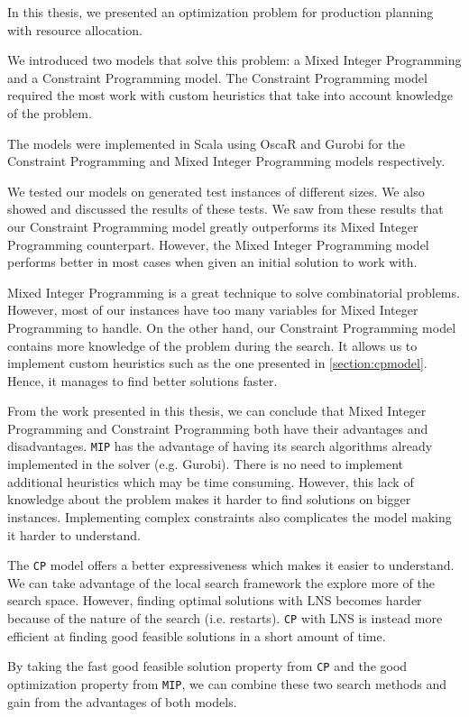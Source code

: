 \documentclass[../thesis.tex]{subfiles}
\begin{document}
In this thesis, we presented an optimization problem for production planning 
with resource allocation.

We introduced two models that solve
this problem: a Mixed Integer Programming and a Constraint Programming model.
The Constraint Programming model required the most work with custom heuristics that take into account knowledge of the problem.

The models were implemented in Scala using OscaR and Gurobi for the Constraint Programming and Mixed Integer Programming models respectively.

We tested our models on generated test instances of different sizes.
We also showed and discussed the results of these tests. We saw from these results that our Constraint Programming model greatly outperforms
its Mixed Integer Programming counterpart.
However, the Mixed Integer Programming model performs better in most cases when given an initial solution 
to work with.


Mixed Integer Programming is a great technique to solve combinatorial problems. However, most of our 
instances have too many variables for Mixed Integer Programming to handle.
On the other hand,
our Constraint Programming model contains more knowledge of the problem during the search. 
It allows us to implement custom heuristics such as the one presented in \autoref{section:cpmodel}. Hence, it manages to find 
better solutions faster. 

From the work presented in this thesis, we can conclude that Mixed Integer Programming and Constraint Programming both have their advantages and disadvantages.
\texttt{MIP} has the advantage of having its search algorithms already implemented in the solver (e.g. Gurobi). There is no need 
to implement additional heuristics which may be time consuming. However, this lack of knowledge about the problem makes 
it harder to find solutions on bigger instances. Implementing complex constraints also complicates the model making it harder to understand. 

The \texttt{CP} model offers a better expressiveness which makes it easier to understand. We can take advantage of the local search 
framework the explore more of the search space. However, finding optimal solutions with LNS becomes harder because of 
the nature of the search (i.e. restarts). \texttt{CP} with LNS is instead more efficient at finding good feasible solutions in a 
short amount of time.

By taking the fast good feasible solution property from \texttt{CP} and the good optimization property from \texttt{MIP}, we can combine these two 
search methods and gain from the advantages of both models.
\end{document}

